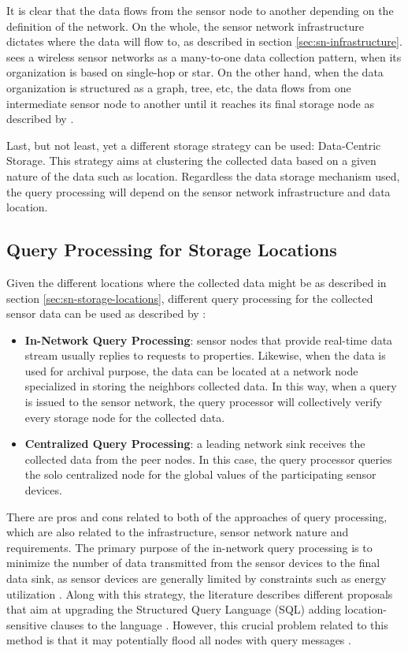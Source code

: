 It is clear that the data flows from the sensor node to another depending on
the definition of the network. On the whole, the sensor network infrastructure
dictates where the data will flow to, as described in section
\ref{sec:sn-infrastructure}. \cite{sn-storage02} sees a wireless sensor
networks as a many-to-one data collection pattern, when its organization is
based on single-hop or star. On the other hand, when the data organization is
structured as a graph, tree, etc, the data flows from one intermediate sensor
node to another until it reaches its final storage node as described by
\cite{sn-storage01, sn-storage03}.

Last, but not least, yet a different storage strategy can be used: Data-Centric
Storage. This strategy aims at clustering the collected data based on a given
nature of the data such as location. Regardless the data storage mechanism
used, the query processing will depend on the sensor network infrastructure and
data location.

\subsection{Query Processing for Storage Locations}
\label{sec:query-process}

Given the different locations where the collected data might be as described in
section \ref{sec:sn-storage-locations}, different query processing for the
collected sensor data can be used as described by \cite{sn-storage03}:

\begin{itemize}
  \item \textbf{In-Network Query Processing}: sensor nodes that provide
  real-time data stream usually replies to requests to properties.
  Likewise, when the data is used for archival purpose, the data can be
  located at a network node specialized in storing the neighbors
  collected data. In this way, when a query is issued to the sensor
  network, the query processor will collectively verify every storage
  node for the collected data.
  \item \textbf{Centralized Query Processing}: a leading network sink receives
  the collected data from the peer nodes. In this case, the query processor
  queries the solo centralized node for the global values of the
  participating sensor devices.
\end{itemize}

There are pros and cons related to both of the approaches of query processing,
which are also related to the infrastructure, sensor network nature and
requirements. The primary purpose of the in-network query processing is to
minimize the number of data transmitted from the sensor devices to the final
data sink, as sensor devices are generally limited by constraints such as
energy utilization \cite{sn-storage03}. Along with this strategy, the literature
describes different proposals that aim at upgrading the Structured Query
Language (SQL) adding location-sensitive clauses to the language \cite{sn-db-newop}.
However, this crucial problem related to this method is that it may potentially
flood all nodes with query messages \cite{sn-storage04}.

